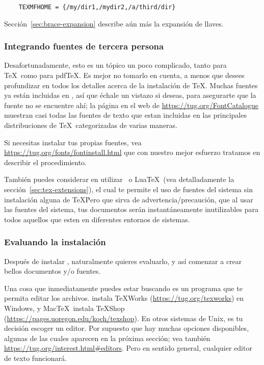 \documentclass{article}
\begin{document}
\begin{verbatim}
	TEXMFHOME = {/my/dir1,/mydir2,/a/third/dir}
\end{verbatim}

Sección~\ref{sec:brace-expansion} describe aún más la expansión de llaves. 

\subsubsection{Integrando fuentes de tercera persona}

Desafortunadamente, esto es un tópico un poco complicado, tanto para \TeX\ como para pdf\TeX{}. Es mejor no
tomarlo en cuenta, a menos que desees profundizar en todos los
detalles acerca de la instalación de \TeX{}. Muchas fuentes ya están
incluidas en \TL, así que échale un vistazo si deseas, para asegurarte que la fuente no se encuentre ahí; la página en el web de \url{https://tug.org/FontCatalogue} muestran casi todas las fuentes de texto que estan incluidas en las principales distribuciones de \TeX\, categorizadas de varias maneras.
 
Si necesitas instalar tus propias fuentes, vea
\url{https://tug.org/fonts/fontinstall.html} que con nuestro mejor esfuerzo tratamos en describir el procedimiento.
  
También puedes considerar en utilizar \XeTeX\ o Lua\TeX\ (vea detalladamente la sección~\ref{sec:tex-extensions}), el cual te permite el uso de fuentes del sistema sin instalación alguna de \TeX\. Pero que sirva de advertencia/precaución, que al usar las fuentes del sistema, tus documentos serán instantáneamente inutilizables para todos aquellos que esten en diferentes entornos de sistemas. 
   
\subsubsection{Evaluando la instalación}
\label{sec:test-install}

Después de instalar \TL{}, naturalmente quieres evaluarlo, y así
comenzar a crear bellos documentos y\slash o fuentes. 

Una cosa que inmediatamente puedes estar buscando es un programa que te
permita editar los archivos. \TL{} instala \TeX{}Works
(\url{https://tug.org/texworks}) en Windows, y Mac\TeX\ instala TeXShop
(\url{https://pages.uoregon.edu/koch/texshop}). En otros sistemas de
Unix, es tu decisión escoger un editor. Por supuesto que hay muchas
opciones disponibles, algunas de las cuales aparecen en la próxima
sección; vea también \url{https://tug.org/interest.html#editors}. Pero
en sentido general, cualquier editor de texto funcionará.
\end{document}
